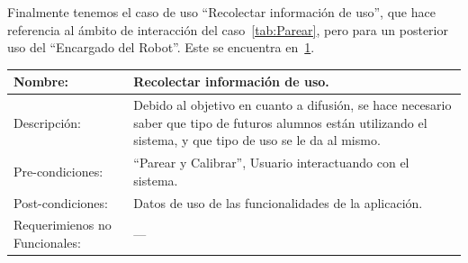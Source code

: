 \documentclass[letterpaper,12pt]{article} %
\numberwithin{equation}{section} %
\numberwithin{figure}{section} %
\numberwithin{table}{section} %
\begin{document}
Finalmente tenemos el caso de uso ``Recolectar informaci\'on de uso'', que hace referencia al \'ambito de interacci\'on del caso~\ref{tab:Parear}, pero para un posterior uso del ``Encargado del Robot''. Este se encuentra en~\ref{tab:Recolectar}.

\begin{table}[hb!]
  \begin{tabular}{p{3cm}p{7cm}}\hline\hline
    Nombre: & Recolectar informaci\'on de uso.\\ \hline
    Descripci\'on: & Debido al objetivo en cuanto a difusi\'on, se hace necesario saber que tipo de futuros alumnos est\'an utilizando el sistema, y que tipo de uso se le da al mismo.\\ \hline %
    Pre-condiciones: & ``Parear y Calibrar'', Usuario interactuando con el sistema.\\ \hline
    Post-condiciones: & Datos de uso de las funcionalidades de la aplicaci\'on.\\ \hline
    Requerimienos no Funcionales: & ---\\ \hline\hline %
  \end{tabular}
  \label{tab:Recolectar}
\end{table}



%
%
%
%
%
\end{document}
